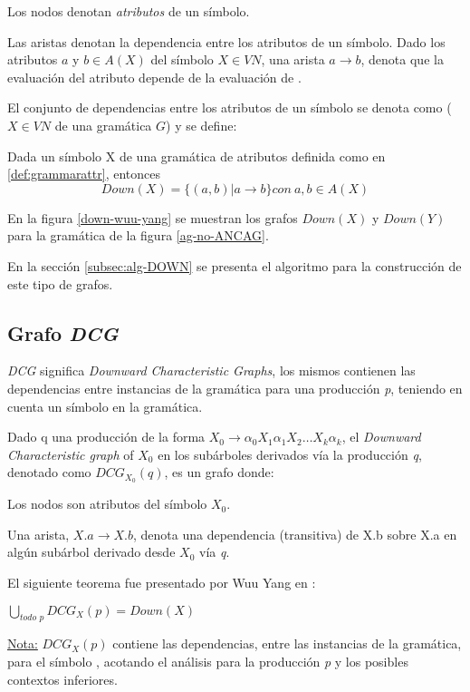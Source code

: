 \begin{items}
\item Los nodos denotan \textit{atributos} de un símbolo.
\item Las aristas denotan la dependencia entre los atributos de un símbolo. Dado los atributos $a$ y $b\in A(X)$ del símbolo $X\in VN$, una arista $a\rightarrow b$, denota que la evaluación del atributo  depende de la evaluación de . 
\end{items}
El conjunto de dependencias entre los atributos de un símbolo se denota como  
($X\in VN$ de una gramática $G$) y se define:
\begin{definition}
Dada un símbolo X de una gramática de atributos definida como en \ref{def:grammarattr}, entonces
\begin{equation}
Down(X) = \{(a,b) | a \rightarrow b \} con\ a,b \in A(X)
\end{equation}
\end{definition}
En la figura \ref{down-wuu-yang} se muestran los grafos $Down(X)$ y $Down(Y)$ para la gramática de la figura \ref{ag-no-ANCAG}.

En la sección \ref{subsec:alg-DOWN} se presenta el algoritmo para la construcción de este tipo de grafos.

\subsection{Grafo \textit{DCG}}
\label{subsec:graph-dcg-def}
\textit{DCG} significa \textit{Downward Characteristic Graphs}, los mismos contienen las dependencias entre instancias de la gramática para una producción \textit{p}, teniendo en cuenta un símbolo en la gramática.
\begin{definition}
Dado q una producción de la forma $X_{0}\rightarrow \alpha_{0} X_{1} \alpha_{1} X_{2} \dots X_{k} \alpha_{k}$, el \textit{Downward Characteristic graph} of $X_{0}$ en los subárboles derivados vía la producción \textit{q}, denotado como $DCG_{X_{0}}(q)$, es un grafo donde: 
\begin{items}
\item Los nodos son atributos del símbolo $X_{0}$.
\item Una arista, $X.a \rightarrow X.b$, denota una dependencia (transitiva) de X.b sobre X.a en algún subárbol derivado desde $X_{0}$ vía \textit{q}.
\end{items}
\end{definition}
El siguiente teorema fue presentado por Wuu Yang en \cite{wuu-yang1}:
\begin{theorem}
$\bigcup\limits_{\textit{todo p}}{DCG_{X} (p) = Down (X)}$
\end{theorem}
\underline{Nota:} $DCG_{X}(p)$ contiene las dependencias, entre las instancias de la gramática, para el símbolo , acotando el análisis para la producción \textit{p} y los posibles contextos inferiores.

